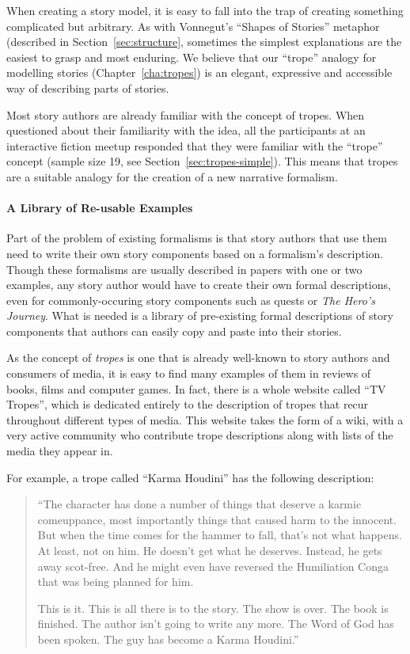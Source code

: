 \documentclass[11pt]{report}
\begin{document}
When creating a story model, it is easy to fall into the trap of creating
something complicated but arbitrary. As with Vonnegut's ``Shapes of Stories''
metaphor (described in Section~\ref{sec:structure}, sometimes the simplest
explanations are the easiest to grasp and most enduring. We believe that our
``trope'' analogy for modelling stories (Chapter~\ref{cha:tropes}) is an
elegant, expressive and accessible way of describing parts of stories.

Most story authors are already familiar with the concept of tropes. When
questioned about their familiarity with the idea, all the participants at an
interactive fiction meetup responded that they were familiar with the ``trope''
concept (sample size 19, see Section~\ref{sec:tropes-simple}). This means that tropes are a
suitable analogy for the creation of a new narrative formalism.

\paragraph{A Library of Re-usable Examples}
Part of the problem of existing formalisms is that story authors that use them
need to write their own story components based on a formalism's description.
Though these formalisms are usually described in papers with one or two
examples, any story author would have to create their own formal descriptions,
even for commonly-occuring story components such as quests or \emph{The Hero's
  Journey}. What is needed is a library of pre-existing formal descriptions of
story components that authors can easily copy and paste into their stories.

As the concept of \emph{tropes} is one that is already well-known to story
authors and consumers of media, it is easy to find many examples of them in
reviews of books, films and computer games. In fact, there is a whole website
called ``TV Tropes'', which is dedicated entirely to the description of tropes
that recur throughout different types of media. This website takes the form of a
wiki, with a very active community who contribute trope descriptions along with
lists of the media they appear in.

For example, a trope called ``Karma Houdini'' has the following description:

\begin{quote}
``The character has done a number of things that deserve a karmic comeuppance,
most importantly things that caused harm to the innocent.
But when the time comes for the hammer to fall, that's not what happens. At
least, not on him.
He doesn't get what he deserves. Instead, he gets away scot-free.
And he might even have reversed the Humiliation Conga that was being planned for him.

This is it. This is all there is to the story. The show is over. The book is finished. The author isn't going to write any more. The Word of God has been spoken. The guy has become a Karma Houdini.''
\end{quote}
\end{document}
